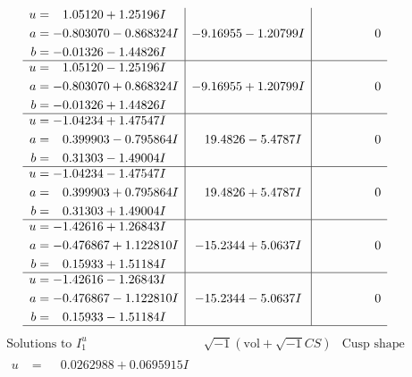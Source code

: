 \documentclass[1p]{elsarticle_modified}
\theoremstyle{definition}
\newcommand{\I}{\sqrt{-1}}
\begin{document}
$$\begin{array}{c|c|c}
\begin{aligned}
u &= \phantom{-}1.05120 + 1.25196 I \\
a &= -0.803070 - 0.868324 I \\
b &= -0.01326 - 1.44826 I\end{aligned}
 & -9.16955 - 1.20799 I & \phantom{-0.000000 } 0 \\ \hline\begin{aligned}
u &= \phantom{-}1.05120 - 1.25196 I \\
a &= -0.803070 + 0.868324 I \\
b &= -0.01326 + 1.44826 I\end{aligned}
 & -9.16955 + 1.20799 I & \phantom{-0.000000 } 0 \\ \hline\begin{aligned}
u &= -1.04234 + 1.47547 I \\
a &= \phantom{-}0.399903 - 0.795864 I \\
b &= \phantom{-}0.31303 - 1.49004 I\end{aligned}
 & \phantom{-}19.4826 - 5.4787 I & \phantom{-0.000000 } 0 \\ \hline\begin{aligned}
u &= -1.04234 - 1.47547 I \\
a &= \phantom{-}0.399903 + 0.795864 I \\
b &= \phantom{-}0.31303 + 1.49004 I\end{aligned}
 & \phantom{-}19.4826 + 5.4787 I & \phantom{-0.000000 } 0 \\ \hline\begin{aligned}
u &= -1.42616 + 1.26843 I \\
a &= -0.476867 + 1.122810 I \\
b &= \phantom{-}0.15933 + 1.51184 I\end{aligned}
 & -15.2344 + 5.0637 I & \phantom{-0.000000 } 0 \\ \hline\begin{aligned}
u &= -1.42616 - 1.26843 I \\
a &= -0.476867 - 1.122810 I \\
b &= \phantom{-}0.15933 - 1.51184 I\end{aligned}
 & -15.2344 - 5.0637 I & \phantom{-0.000000 } 0\\
 \hline 
 \end{array}$$\newpage$$\begin{array}{c|c|c}  
\text{Solutions to }I^u_{1}& \I (\text{vol} + \sqrt{-1}CS) & \text{Cusp shape}\\
 \hline 
\begin{aligned}
u &= \phantom{-}0.0262988 + 0.0695915 I \\

\end{aligned}
\end{array}$$
\end{document}
